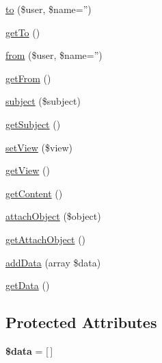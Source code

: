 \begin{DoxyCompactItemize}
\item 
\hyperlink{classDMA_1_1Friends_1_1Classes_1_1Notifications_1_1NotificationMessage_aa06665480e18b8c67f44d540d40de056}{to} (\$user, \$name='')
\item 
\hyperlink{classDMA_1_1Friends_1_1Classes_1_1Notifications_1_1NotificationMessage_a4624b8e70bbf7a7bb78f1fe3f66e1000}{get\+To} ()
\item 
\hyperlink{classDMA_1_1Friends_1_1Classes_1_1Notifications_1_1NotificationMessage_ae41e62a261b29dd2263cc44ec4f07a06}{from} (\$user, \$name='')
\item 
\hyperlink{classDMA_1_1Friends_1_1Classes_1_1Notifications_1_1NotificationMessage_ab25f664635774de1c070fc64f31e11db}{get\+From} ()
\item 
\hyperlink{classDMA_1_1Friends_1_1Classes_1_1Notifications_1_1NotificationMessage_a56bd484fb63c383f55abc7a6b3cd569c}{subject} (\$subject)
\item 
\hyperlink{classDMA_1_1Friends_1_1Classes_1_1Notifications_1_1NotificationMessage_ab654c9e552ea3bcb7603c1b415163834}{get\+Subject} ()
\item 
\hyperlink{classDMA_1_1Friends_1_1Classes_1_1Notifications_1_1NotificationMessage_a1ebaa3a47663e91b9ea9eca7cc2b4b6b}{set\+View} (\$view)
\item 
\hyperlink{classDMA_1_1Friends_1_1Classes_1_1Notifications_1_1NotificationMessage_a8269a0bcd82e25101aa41e11b380005f}{get\+View} ()
\item 
\hyperlink{classDMA_1_1Friends_1_1Classes_1_1Notifications_1_1NotificationMessage_a4e5099271352936d95e261e7a799aba7}{get\+Content} ()
\item 
\hyperlink{classDMA_1_1Friends_1_1Classes_1_1Notifications_1_1NotificationMessage_ae4e128ad7a5e92489aa72c162ae48ee6}{attach\+Object} (\$object)
\item 
\hyperlink{classDMA_1_1Friends_1_1Classes_1_1Notifications_1_1NotificationMessage_a1db5f00dcc6d8a616da8a3b7455dffd6}{get\+Attach\+Object} ()
\item 
\hyperlink{classDMA_1_1Friends_1_1Classes_1_1Notifications_1_1NotificationMessage_a0ae6a64348a2d1d83cb8f8500f350b6a}{add\+Data} (array \$data)
\item 
\hyperlink{classDMA_1_1Friends_1_1Classes_1_1Notifications_1_1NotificationMessage_a88fd7fe66421a83715d711d7d9871e36}{get\+Data} ()
\end{DoxyCompactItemize}
\subsection*{Protected Attributes}
\begin{DoxyCompactItemize}
\item 
\hypertarget{classDMA_1_1Friends_1_1Classes_1_1Notifications_1_1NotificationMessage_ad2359e3a12a45d8eef6439efae50f245}{{\bfseries \$data} = \mbox{[}$\,$\mbox{]}}\label{classDMA_1_1Friends_1_1Classes_1_1Notifications_1_1NotificationMessage_ad2359e3a12a45d8eef6439efae50f245}

\end{DoxyCompactItemize}


